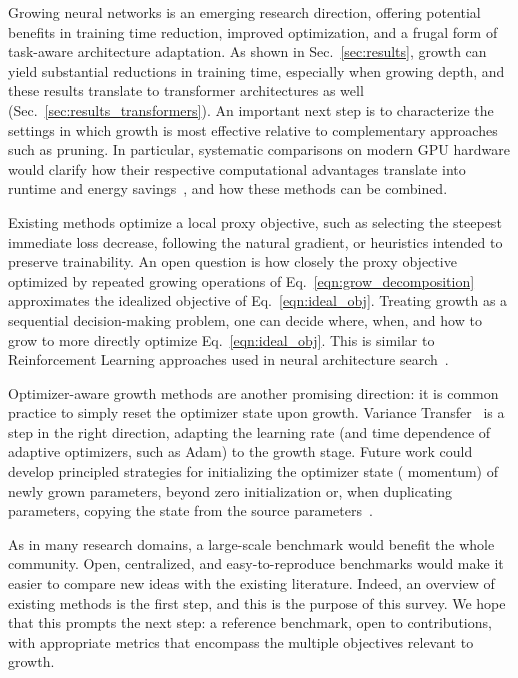 
Growing neural networks is an emerging research direction, offering potential benefits in training time reduction, improved optimization, and a frugal form of task-aware architecture adaptation. As shown in Sec.~\ref{sec:results}, growth can yield substantial reductions in training time, especially when growing depth, and these results translate to transformer architectures as well (Sec.~\ref{sec:results_transformers}). An important next step is to characterize the settings in which growth is most effective relative to complementary approaches such as pruning. In particular, systematic comparisons on modern GPU hardware would clarify how their respective computational advantages translate into runtime and energy savings~\citep{boumendil_grow_2023}, and how these methods can be combined.

Existing methods optimize a local proxy objective, such as selecting the steepest immediate loss decrease, following the natural gradient, or heuristics intended to preserve trainability. An open question is how closely the proxy objective optimized by repeated growing operations of Eq.~\eqref{eqn:grow_decomposition} approximates the idealized objective of Eq.~\eqref{eqn:ideal_obj}. Treating growth as a sequential decision-making problem, one can decide where, when, and how to grow to more directly optimize Eq.~\eqref{eqn:ideal_obj}. This is similar to Reinforcement Learning approaches used in neural architecture search~\citep{zoph_neural_2017}.

Optimizer-aware growth methods are another promising direction: it is common practice to simply reset the optimizer state upon growth. Variance Transfer~\citep{yuan_accelerated_2023} is a step in the right direction, adapting the learning rate (and time dependence of adaptive optimizers, such as Adam) to the growth stage. Future work could develop principled strategies for initializing the optimizer state (\eg{} momentum) of newly grown parameters, beyond zero initialization or, when duplicating parameters, copying the state from the source parameters~\citep{shen_staged_2022}.

As in many research domains, a large-scale benchmark would benefit the whole community. Open, centralized, and easy-to-reproduce benchmarks would make it easier to compare new ideas with the existing literature. Indeed, an overview of existing methods is the first step, and this is the purpose of this survey. We hope that this prompts the next step: a reference benchmark, open to contributions, with appropriate metrics that encompass the multiple objectives relevant to growth.


